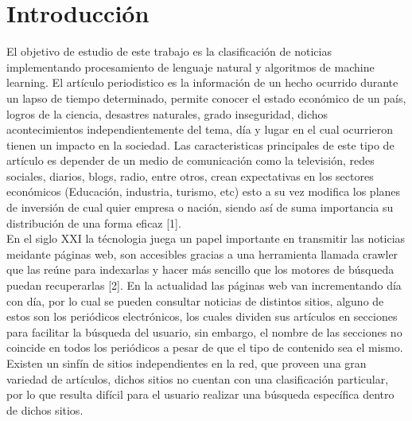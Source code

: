 \documentclass{book}
\begin{document}
\pagestyle{plain}


  \tableofcontents




\mainmatter


\chapter{Introducción}\label{chp:introduccion}

El objetivo de estudio de este trabajo es la clasificación de noticias implementando 
procesamiento de lenguaje natural y algoritmos de machine learning. El artículo periodistico es la información de un hecho ocurrido durante un lapso de tiempo determinado, permite conocer el estado económico de un país, logros de la ciencia, desastres naturales, grado inseguridad, dichos acontecimientos independientemente del tema, día y lugar en el cual ocurrieron tienen un impacto en la sociedad. Las caracteristicas principales de este tipo de artículo es depender de un medio de comunicación como la televisión, redes sociales, diarios, blogs, radio, entre otros, crean expectativas en los sectores económicos (Educación, industria, turismo, etc) esto a su vez modifica los planes de inversión de cual quier empresa o nación, siendo así de suma importancia su distribución de una forma eficaz [1].\\

En el siglo XXI la técnologia juega un papel importante en transmitir las noticias meidante páginas web, son accesibles gracias a una herramienta llamada crawler que las reúne para indexarlas y hacer más sencillo que los motores de búsqueda puedan recuperarlas [2]. En la actualidad las páginas web van incrementando día con día, por lo cual se pueden consultar noticias de distintos sitios, alguno de estos son los periódicos electrónicos, los cuales dividen sus artículos en secciones para facilitar la búsqueda del usuario, sin embargo, el nombre de las secciones no coincide en todos los periódicos a pesar de que el tipo de contenido sea el mismo. Existen un sinfín de sitios independientes en la red, que proveen una gran variedad de artículos, dichos sitios no cuentan con una clasificación particular, por lo que resulta difícil para el usuario realizar una búsqueda específica dentro de dichos sitios.
\end{document}
